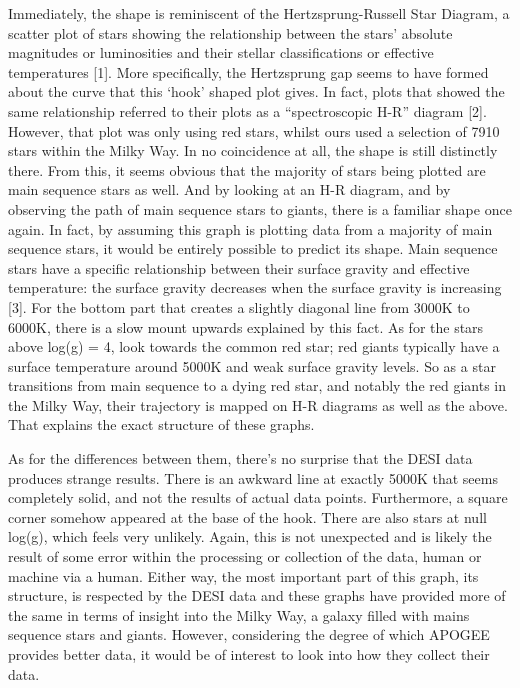 \documentclass{article}
\begin{document}
\indent Immediately, the shape is reminiscent of the Hertzsprung-Russell Star Diagram, a scatter plot of stars showing the relationship between the stars' absolute magnitudes or luminosities and their stellar classifications or effective temperatures [1]. More specifically, the Hertzsprung gap seems to have formed about the curve that this ‘hook’ shaped plot gives. In fact, plots that showed the same relationship referred to their plots as a “spectroscopic H-R” diagram [2]. However, that plot was only using red stars, whilst ours used a selection of 7910 stars within the Milky Way. In no coincidence at all, the shape is still distinctly there. From this, it seems obvious that the majority of stars being plotted are main sequence stars as well. And by looking at an H-R diagram, and by observing the path of main sequence stars to giants, there is a familiar shape once again. In fact, by assuming this graph is plotting data from a majority of main sequence stars, it would be entirely possible to predict its shape. Main sequence stars have a specific relationship between their surface gravity and effective temperature: the surface gravity decreases when the surface gravity is increasing [3]. For the bottom part that creates a slightly diagonal line from 3000K to 6000K, there is a slow mount upwards explained by this fact. As for the stars above log(g) = 4, look towards the common red star; red giants typically have a surface temperature around 5000K and weak surface gravity levels. So as a star transitions from main sequence to a dying red star, and notably the red giants in the Milky Way, their trajectory is mapped on H-R diagrams as well as the above. That explains the exact structure of these graphs.

\indent As for the differences between them, there’s no surprise that the DESI data produces strange results. There is an awkward line at exactly 5000K that seems completely solid, and not the results of actual data points. Furthermore, a square corner somehow appeared at the base of the hook. There are also stars at null log(g), which feels very unlikely. Again, this is not unexpected and is likely the result of some error within the processing or collection of the data, human or machine via a human. Either way, the most important part of this graph, its structure, is respected by the DESI data and these graphs have provided more of the same in terms of insight into the Milky Way, a galaxy filled with mains sequence stars and giants. However, considering the degree of which APOGEE provides better data, it would be of interest to look into how they collect their data.\\
\end{document}
